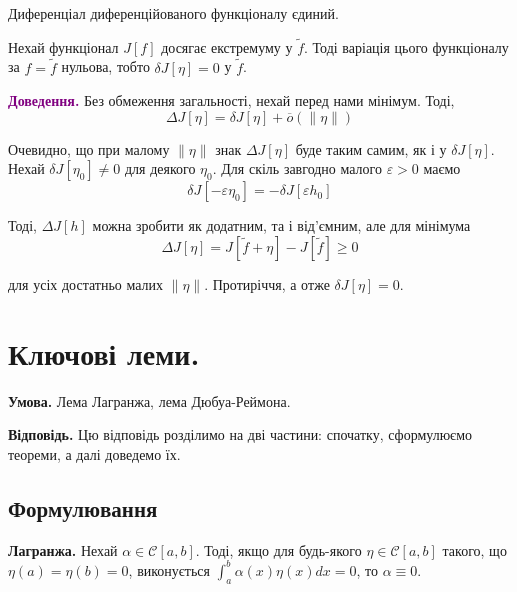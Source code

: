 \documentclass[14pt]{extarticle}
\newcommand{\<}{\langle}
\renewcommand{\>}{\rangle}
\theoremstyle{mystyle}{\newtheorem{definition}{Definition}[section]}
\theoremstyle{mystyle}{\newtheorem{proposition}[definition]{Proposition}}
\theoremstyle{mystyle}{\newtheorem{theorem}[definition]{Theorem}}
\theoremstyle{mystyle}{\newtheorem{lemma}[definition]{Lemma}}
\theoremstyle{mystyle}{\newtheorem{corollary}[definition]{Corollary}}
\theoremstyle{mystyle}{\newtheorem*{remark}{Remark}}
\theoremstyle{mystyle}{\newtheorem*{remarks}{Remarks}}
\theoremstyle{mystyle}{\newtheorem*{example}{Example}}
\theoremstyle{mystyle}{\newtheorem*{examples}{Examples}}
\theoremstyle{definition}{\newtheorem*{exercise}{Exercise}}
\theoremstyle{cstyle}{\newtheorem*{cthm}{}}
\theoremstyle{warn}
\begin{document}
\begin{theorem} Диференціал диференційованого функціоналу єдиний.
\end{theorem}

\begin{theorem} 
    Нехай функціонал $J[f]$ досягає екстремуму у $\widetilde{f}$. Тоді варіація цього функціоналу за $f=\widetilde{f}$ нульова, тобто $\delta J[\eta]=0$ у $\widetilde{f}$.
\end{theorem}

\textcolor{purple}{\textbf{Доведення.}} Без обмеження загальності, нехай перед нами мінімум. Тоді,
\begin{equation}
    \Delta J[\eta] = \delta J[\eta] + \overline{o}(\|\eta\|)
\end{equation}

Очевидно, що при малому $\|\eta\|$ знак $\Delta J[\eta]$ буде таким самим, як і у $\delta J[\eta]$. 
Нехай $\delta J[\eta_0] \neq 0$ для деякого $\eta_0$. Для скіль завгодно малого $\varepsilon>0$ маємо
\begin{equation}
    \delta J[-\varepsilon \eta_0] = -\delta J[\varepsilon h_0]
\end{equation} 

Тоді, $\Delta J[h]$ можна зробити як додатним, та і від'ємним, але для мінімума 
\begin{equation}
    \Delta J[\eta] = J[\widetilde{f} + \eta] - J[\widetilde{f}] \geq 0
\end{equation}

для усіх достатньо малих $\|\eta\|$. Протиріччя, а отже $\delta J[\eta]=0$.

\pagebreak

\section{Ключові леми.}

\textbf{Умова.} Лема Лагранжа, лема Дюбуа-Реймона.

\textbf{Відповідь.} Цю відповідь розділимо на дві частини: спочатку, сформулюємо теореми, а далі доведемо їх.

\subsection{Формулювання}

\begin{lemma}\textbf{Лагранжа.} Нехай $\alpha \in \mathcal{C}[a,b]$. Тоді, якщо для будь-якого $\eta \in \mathcal{C}[a,b]$ такого, що $\eta(a)=\eta(b)=0$, виконується $\int_a^b \alpha(x)\eta(x)dx=0$, то $\alpha \equiv 0$.
\end{lemma}
\end{document}
